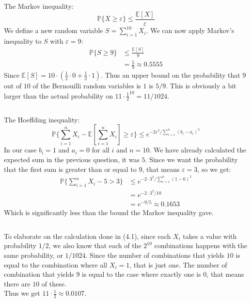 \documentclass[a4paper]{article}
\begin{document}
\subsection{}
The Markov inequality:
$$\mathbb{P}\{X\geq \varepsilon \}\leq \frac{\mathbb{E}[X]}{\varepsilon}$$
We define a new random variable $S=\sum_{i=1}^{10}X_i$. We can now apply Markov's inequality to $S$ with $\varepsilon=9$: \\
\begin{align*}
\mathbb{P}\{S\geq 9\}&\leq \frac{\mathbb{E}[S]}{9} \\
&= \frac{5}{9}\approx 0.5555
\end{align*}
Since $\mathbb{E}[S]=10\cdot(\frac{1}{2}\cdot 0+\frac{1}{2}\cdot 1)$. Thus an upper bound on the probability that $9$ out of $10$ of the Bernouilli random variables is $1$ is $5/9$. This is obviously a bit larger than the actual probability on $11\cdot \frac{1}{2}^{10}=11/1024$.

\subsection{}
The Hoeffding inequality:
$$\mathbb{P}\{\sum_{i=1}^nX_i-\mathbb{E}\left[\sum_{i=1}^nX_i\right] \geq \varepsilon\}\leq e^{-2\varepsilon^2/\sum_{i=1}^n(b_i-a_i)^2}$$
In our case $b_i=1$ and $a_i=0$ for all $i$ and $n=10$. We have already calculated the expected sum in the previous question, it was $5$. Since we want the probability that the first sum is greater than or equal to $9$, that means $\varepsilon=3$, so we get:
\begin{align*}
\mathbb{P}\{\sum_{i=1}^nX_i-5 > 3\}&\leq e^{-2\cdot 3^2/\sum_{i=1}^n(1-0)^2} \\
&= e^{-2\cdot 3^2/10} \\
&= e^{-9/5}\approx 0.1653
\end{align*}
Which is significantly less than the bound the Markov inequality gave.

\subsection{}
To elaborate on the calculation done in (4.1), since each $X_i$ takes a value with probability $1/2$, we also know that each of the $2^10$ combinations happens with the same probability, or $1/1024$. Since the number of combinations that yields $10$ is equal to the combination where all $X_i=1$, that is just one. The number of combination that yields $9$ is equal to the case where exactly one is $0$, that means there are $10$ of these. \\Thus we get $11\cdot \frac{1}{2}\approx 0.0107$.
\end{document}
